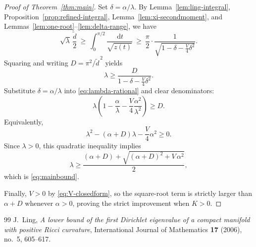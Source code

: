 \documentclass[10pt,a4paper]{amsart}
\newcommand{\dd}{\,\mathrm{d}}
\newcommand{\de}{\tilde d}
\theoremstyle{plain}
\theoremstyle{remark}
\begin{document}
\begin{proof}[Proof of Theorem~\ref{thm:main}]
Set $\delta=\alpha/\lambda$.
By Lemma~\ref{lem:ling-integral}, Proposition~\ref{prop:refined-integral}, Lemma~\ref{lem:xi-secondmoment}, and Lemmas~\ref{lem:one-root}--\ref{lem:delta-range}, we have
\begin{equation}
\sqrt{\lambda}\,\frac{\de}{2}
\ \ge\
\int_{0}^{\pi/2}\frac{\dd t}{\sqrt{z(t)}}
\ \ge\
\frac{\pi}{2}\cdot\frac{1}{\sqrt{1-\delta-\frac{V}{4}\delta^2}}.
\end{equation}
Squaring and writing $D=\pi^2/\de^{\,2}$ yields
\begin{equation}
\label{eq:lambda-rational}
\lambda \ge \frac{D}{1-\delta-\frac{V}{4}\delta^2}.
\end{equation}
Substitute $\delta=\alpha/\lambda$ into \eqref{eq:lambda-rational} and clear denominators:
\begin{equation}
\lambda\left(1-\frac{\alpha}{\lambda}-\frac{V}{4}\frac{\alpha^2}{\lambda^2}\right)\ge D.
\end{equation}
Equivalently,
\begin{equation}
\lambda^2-(\alpha+D)\lambda-\frac{V}{4}\alpha^2\ge 0.
\end{equation}
Since $\lambda>0$, this quadratic inequality implies
\begin{equation}
\lambda\ge \frac{(\alpha+D)+\sqrt{(\alpha+D)^2+V\,\alpha^2}}{2},
\end{equation}
which is \eqref{eq:mainbound}.

Finally, $V>0$ by \eqref{eq:V-closedform}, so the square-root term is strictly larger than $\alpha+D$ whenever $\alpha>0$, proving the strict improvement when $K>0$.
\end{proof}

\begin{thebibliography}{99}
 J.~Ling, \emph{A lower bound of the first Dirichlet eigenvalue of a compact manifold with positive Ricci curvature}, International Journal of Mathematics \textbf{17} (2006), no.~5, 605--617.
\end{thebibliography}
\end{document}
